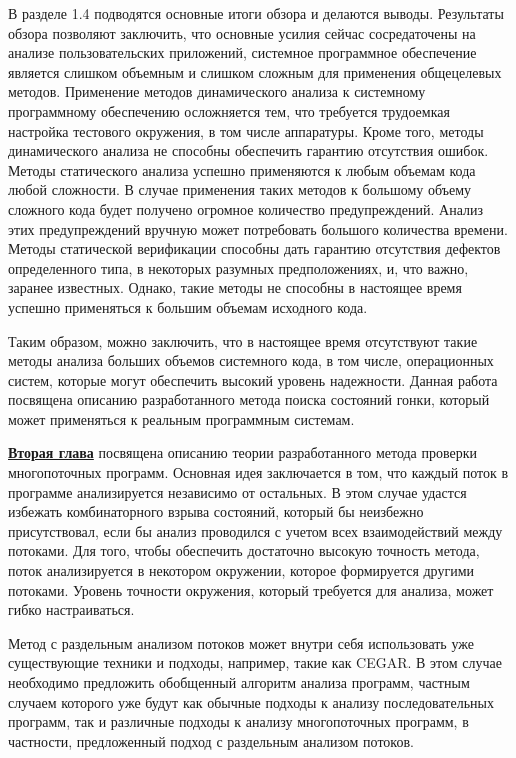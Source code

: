 В разделе 1.4 подводятся основные итоги обзора и делаются выводы.
Результаты обзора позволяют заключить, что основные усилия сейчас сосредаточены на анализе пользовательских приложений, 
системное программное обеспечение является слишком объемным и слишком сложным для применения общецелевых методов.
Применение методов динамического анализа к системному программному обеспечению осложняется тем, что требуется трудоемкая настройка тестового окружения, в том числе аппаратуры.
Кроме того, методы динамического анализа не способны обеспечить гарантию отсутствия ошибок.
Методы статического анализа успешно применяются к любым объемам кода любой сложности. 
В случае применения таких методов к большому объему сложного кода будет получено огромное количество предупреждений.
Анализ этих предупреждений вручную может потребовать большого количества времени.
Методы статической верификации способны дать гарантию отсутствия дефектов определенного типа, в некоторых разумных предположениях, и, что важно, заранее известных.
Однако, такие методы не способны в настоящее время успешно применяться к большим объемам исходного кода.

Таким образом, можно заключить, что в настоящее время отсутствуют такие методы анализа больших объемов системного кода, в том числе, операционных систем, которые могут обеспечить высокий уровень надежности.
Данная работа посвящена описанию разработанного метода поиска состояний гонки, который может применяться к реальным программным системам.

\underline{\textbf{Вторая глава}} посвящена описанию теории разработанного метода проверки многопоточных программ.
Основная идея заключается в том, что каждый поток в программе анализируется независимо от остальных.
В этом случае удастся избежать комбинаторного взрыва состояний, который бы неизбежно присутствовал, если бы анализ проводился с учетом всех взаимодействий между потоками.
Для того, чтобы обеспечить достаточно высокую точность метода, поток анализируется в некотором окружении, которое формируется другими потоками. 
Уровень точности окружения, который требуется для анализа, может гибко настраиваться.

Метод с раздельным анализом потоков может внутри себя использовать уже существующие техники и подходы, например, такие как CEGAR.
В этом случае необходимо предложить обобщенный алгоритм анализа программ, частным случаем которого уже будут как обычные подходы к анализу последовательных программ, так и различные подходы к анализу многопоточных программ, в частности, предложенный подход с раздельным анализом потоков. 

